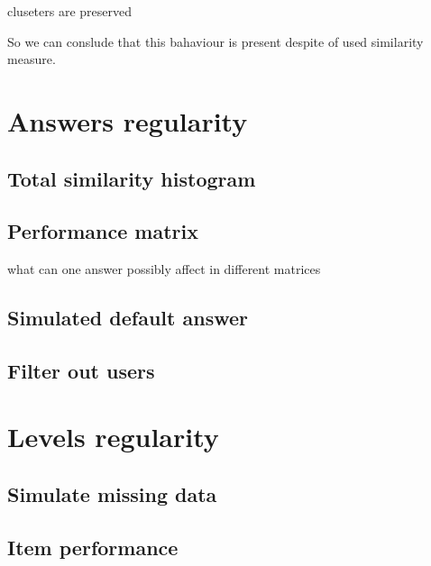 \documentclass[
  digital, %
  table,   %
  nolof,     %
  nolot,     %
  nocover
]{fithesis3}
\begin{document}
cluseters are preserved

So we can conslude that this bahaviour is present despite of used similarity measure.

\section{Answers regularity}

\subsection{Total similarity histogram}





\subsection{Performance matrix}

what can one answer possibly affect in different matrices



\subsection{Simulated default answer}





\subsection{Filter out users}





\section{Levels regularity}

\subsection{Simulate missing data}





\subsection{Item performance}
\end{document}
